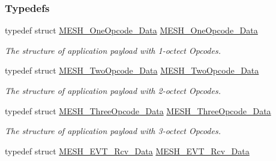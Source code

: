 \subsubsection*{Typedefs}
\begin{DoxyCompactItemize}
\item 
typedef struct \hyperlink{struct_m_e_s_h___one_opcode___data}{M\+E\+S\+H\+\_\+\+One\+Opcode\+\_\+\+Data} \hyperlink{group___m_e_s_h_gab177c1d3cafedbfdfb8ce2dee082bfa3}{M\+E\+S\+H\+\_\+\+One\+Opcode\+\_\+\+Data}\hypertarget{group___m_e_s_h_gab177c1d3cafedbfdfb8ce2dee082bfa3}{}\label{group___m_e_s_h_gab177c1d3cafedbfdfb8ce2dee082bfa3}

\begin{DoxyCompactList}\small\item\em The structure of application payload with 1-\/octect Opcodes. \end{DoxyCompactList}\item 
typedef struct \hyperlink{struct_m_e_s_h___two_opcode___data}{M\+E\+S\+H\+\_\+\+Two\+Opcode\+\_\+\+Data} \hyperlink{group___m_e_s_h_ga65a121a02998a47f9cf1dbf9933f6d52}{M\+E\+S\+H\+\_\+\+Two\+Opcode\+\_\+\+Data}\hypertarget{group___m_e_s_h_ga65a121a02998a47f9cf1dbf9933f6d52}{}\label{group___m_e_s_h_ga65a121a02998a47f9cf1dbf9933f6d52}

\begin{DoxyCompactList}\small\item\em The structure of application payload with 2-\/octect Opcodes. \end{DoxyCompactList}\item 
typedef struct \hyperlink{struct_m_e_s_h___three_opcode___data}{M\+E\+S\+H\+\_\+\+Three\+Opcode\+\_\+\+Data} \hyperlink{group___m_e_s_h_ga8ead079edca9869661c3faff50f4517c}{M\+E\+S\+H\+\_\+\+Three\+Opcode\+\_\+\+Data}\hypertarget{group___m_e_s_h_ga8ead079edca9869661c3faff50f4517c}{}\label{group___m_e_s_h_ga8ead079edca9869661c3faff50f4517c}

\begin{DoxyCompactList}\small\item\em The structure of application payload with 3-\/octect Opcodes. \end{DoxyCompactList}\item 
typedef struct \hyperlink{struct_m_e_s_h___e_v_t___rcv___data}{M\+E\+S\+H\+\_\+\+E\+V\+T\+\_\+\+Rcv\+\_\+\+Data} \hyperlink{group___m_e_s_h_gada1837dfa08926f09596882754c9eef4}{M\+E\+S\+H\+\_\+\+E\+V\+T\+\_\+\+Rcv\+\_\+\+Data}\hypertarget{group___m_e_s_h_gada1837dfa08926f09596882754c9eef4}{}\label{group___m_e_s_h_gada1837dfa08926f09596882754c9eef4}


\end{DoxyCompactItemize}
